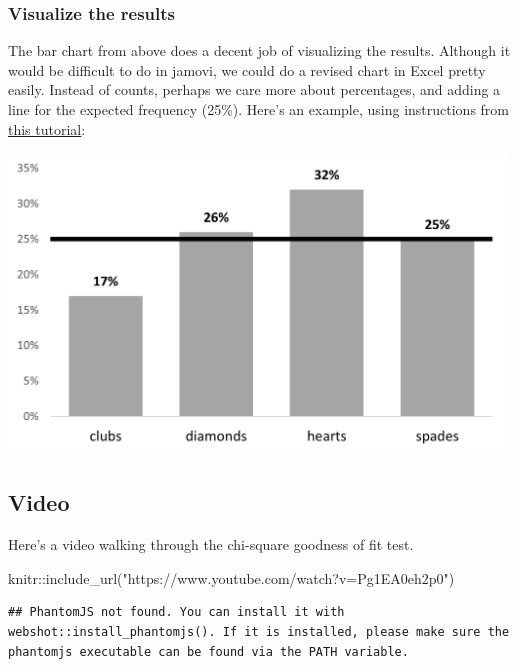\documentclass[
]{book}
\newenvironment{Shaded}{\begin{snugshade}}{\end{snugshade}}
\newcommand{\FunctionTok}[1]{\textcolor[rgb]{0.00,0.00,0.00}{#1}}
\newcommand{\NormalTok}[1]{#1}
\newcommand{\SpecialCharTok}[1]{\textcolor[rgb]{0.00,0.00,0.00}{#1}}
\newcommand{\StringTok}[1]{\textcolor[rgb]{0.31,0.60,0.02}{#1}}
\begin{document}
\hypertarget{visualize-the-results-3}{%
\subsubsection{Visualize the results}\label{visualize-the-results-3}}

The bar chart from above does a decent job of visualizing the results. Although it would be difficult to do in jamovi, we could do a revised chart in Excel pretty easily. Instead of counts, perhaps we care more about percentages, and adding a line for the expected frequency (25\%). Here's an example, using instructions from \href{https://exceljet.net/chart/column-chart-with-target-line}{this tutorial}:

\includegraphics[width=5.20833in,height=\textheight]{images/09-chi-square/chi-square_excel.png}

\hypertarget{video-4}{%
\subsection{Video}\label{video-4}}

Here's a video walking through the chi-square goodness of fit test.

\begin{Shaded}
\begin{Highlighting}[]
\NormalTok{knitr}\SpecialCharTok{::}\FunctionTok{include\_url}\NormalTok{(}\StringTok{"https://www.youtube.com/watch?v=Pg1EA0eh2p0"}\NormalTok{)}
\end{Highlighting}
\end{Shaded}

\begin{verbatim}
## PhantomJS not found. You can install it with webshot::install_phantomjs(). If it is installed, please make sure the phantomjs executable can be found via the PATH variable.
\end{verbatim}
\end{document}
